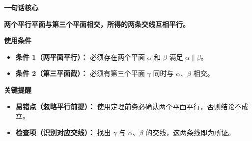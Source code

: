 \begin{summarybox}
	\textbf{\textcolor{CSummary}{一句话核心}}

	\textbf{两个平行平面与第三个平面相交，所得的两条交线互相平行。}

	\medskip
	\textbf{\textcolor{CSummary}{使用条件}}
	\begin{itemize}[leftmargin=*, itemsep=0.5em, topsep=0.4em]
		\item \textbf{条件 1（两平面平行）：} 必须存在两个平面 $\alpha$ 和 $\beta$ 满足 $\alpha\parallel\beta$。
		\item \textbf{条件 2（第三平面截）：} 必须有第三个平面 $\gamma$ 同时与 $\alpha$、$\beta$ 相交。
	\end{itemize}

	\medskip
	\textbf{\textcolor{CSummary}{关键提醒}}
	\begin{itemize}[leftmargin=*, itemsep=0.5em, topsep=0.4em]
		\item \textbf{易错点（忽略平行前提）：} 使用定理前务必确认两个平面平行，否则结论不成立。
		\item \textbf{检查项（识别对应交线）：} 找出 $\gamma$ 与 $\alpha$、$\beta$ 的交线，这两条线即为所证。
	\end{itemize}
\end{summarybox}
